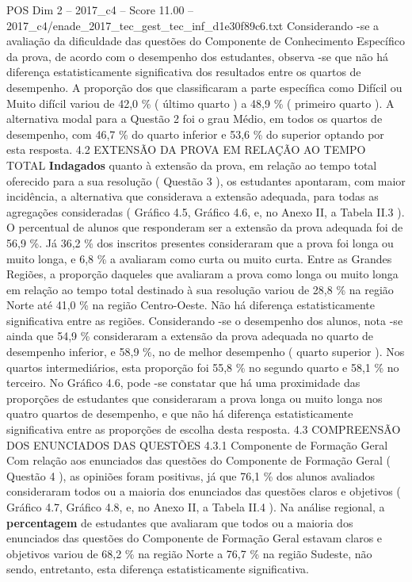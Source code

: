 \begin{textsample}{POS Dim 2 – 2017\_c4 – Score 11.00 – 2017\_c4/enade\_2017\_tec\_gest\_tec\_inf\_d1e30f89c6.txt}
Considerando -se a avaliação da dificuldade das questões do Componente de Conhecimento Específico da prova, de acordo com o desempenho dos estudantes, observa -se que não há diferença estatisticamente significativa dos resultados entre os quartos de desempenho.
A proporção dos que classificaram a parte específica como Difícil ou Muito difícil variou de 42,0 \% ( último quarto ) a 48,9 \% ( primeiro quarto ).
A alternativa modal para a Questão 2 foi o grau Médio, em todos os quartos de desempenho, com 46,7 \% do quarto inferior e 53,6 \% do superior optando por esta resposta. 4.2 EXTENSÃO DA PROVA EM RELAÇÃO AO TEMPO TOTAL \textbf{Indagados} quanto à extensão da prova, em relação ao tempo total oferecido para a sua resolução ( Questão 3 ), os estudantes apontaram, com maior incidência, a alternativa que considerava a extensão adequada, para todas as agregações consideradas ( Gráfico 4.5, Gráfico 4.6, e, no Anexo II, a Tabela II.3 ).
O percentual de alunos que responderam ser a extensão da prova adequada foi de 56,9 \%.
Já 36,2 \% dos inscritos presentes consideraram que a prova foi longa ou muito longa, e 6,8 \% a avaliaram como curta ou muito curta.
Entre as Grandes Regiões, a proporção daqueles que avaliaram a prova como longa ou muito longa em relação ao tempo total destinado à sua resolução variou de 28,8 \% na região Norte até 41,0 \% na região Centro-Oeste.
Não há diferença estatisticamente significativa entre as regiões.
Considerando -se o desempenho dos alunos, nota -se ainda que 54,9 \% consideraram a extensão da prova adequada no quarto de desempenho inferior, e 58,9 \%, no de melhor desempenho ( quarto superior ).
Nos quartos intermediários, esta proporção foi 55,8 \% no segundo quarto e 58,1 \% no terceiro.
No Gráfico 4.6, pode -se constatar que há uma proximidade das proporções de estudantes que consideraram a prova longa ou muito longa nos quatro quartos de desempenho, e que não há diferença estatisticamente significativa entre as proporções de escolha desta resposta. 4.3 COMPREENSÃO DOS ENUNCIADOS DAS QUESTÕES 4.3.1 Componente de Formação Geral Com relação aos enunciados das questões do Componente de Formação Geral ( Questão 4 ), as opiniões foram positivas, já que 76,1 \% dos alunos avaliados consideraram todos ou a maioria dos enunciados das questões claros e objetivos ( Gráfico 4.7, Gráfico 4.8, e, no Anexo II, a Tabela II.4 ).
Na análise regional, a \textbf{percentagem} de estudantes que avaliaram que todos ou a maioria dos enunciados das questões do Componente de Formação Geral estavam claros e objetivos variou de 68,2 \% na região Norte a 76,7 \% na região Sudeste, não sendo, entretanto, esta diferença estatisticamente significativa.

\end{textsample}
